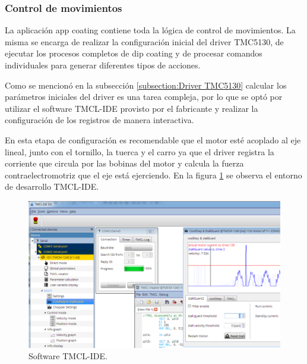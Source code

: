 \subsubsection{Control de movimientos}

La aplicación app coating contiene toda la lógica de control de movimientos. La misma se encarga de realizar la configuración inicial del driver TMC5130, de ejecutar los procesos completos de dip coating y de procesar comandos individuales para generar diferentes tipos de acciones. 

Como se mencionó en la subsección \ref{subsection:Driver TMC5130} calcular los parámetros iniciales del driver es una tarea compleja, por lo que se optó por utilizar el software TMCL-IDE provisto por el fabricante y realizar la configuración de los registros de manera interactiva.


En esta etapa de configuración es recomendable que el motor esté acoplado al eje lineal, junto con el tornillo, la tuerca y el carro ya que el driver registra la corriente que circula por las bobinas del motor y calcula la fuerza contraelectromotriz que el eje está ejerciendo. 
En la figura \ref{fig:tmcl_ide} se observa el entorno de desarrollo TMCL-IDE.  

\begin{figure}[h!]
	\centering
	\includegraphics[width=1\textwidth]{./Figures/tmcl_ide_1.png}
	\caption{Software TMCL-IDE.}
	\label{fig:tmcl_ide}
\end{figure}


